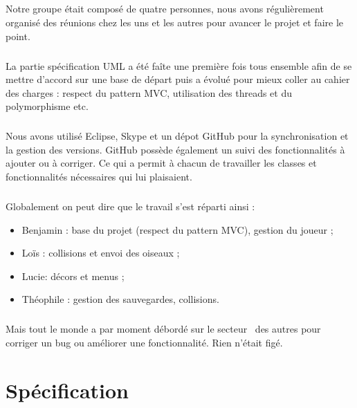 \documentclass[a4paper,12pt]{report}
\begin{document}
\paragraph{}Notre groupe était composé de quatre personnes, nous avons régulièrement organisé des réunions chez les uns et les autres pour avancer le projet et faire le point.

\paragraph{}La partie spécification UML a été faîte une première fois tous ensemble afin de se mettre d'accord sur une base de départ puis a évolué pour mieux coller au cahier des charges : respect du pattern MVC, utilisation des threads et du polymorphisme etc.

\paragraph{}Nous avons utilisé Eclipse, Skype et un dépot GitHub pour la synchronisation et la gestion des versions. GitHub possède également un suivi des fonctionnalités à ajouter ou à corriger. Ce qui a permit à chacun de travailler les classes et fonctionnalités nécessaires qui lui plaisaient.

\paragraph{}Globalement on peut dire que le travail s'est réparti ainsi :
\begin{itemize}
\item Benjamin  : base du projet (respect du pattern MVC), gestion du joueur ;
\item Loïs : collisions et envoi des oiseaux ;
\item Lucie: décors et menus ;
\item Théophile : gestion des sauvegardes, collisions.
\end{itemize}

\paragraph{}Mais tout le monde a par moment débordé sur le \guillemotleft secteur\guillemotright~ des autres pour corriger un bug ou améliorer une fonctionnalité. Rien n'était figé.

\chapter{Spécification}
\end{document}
